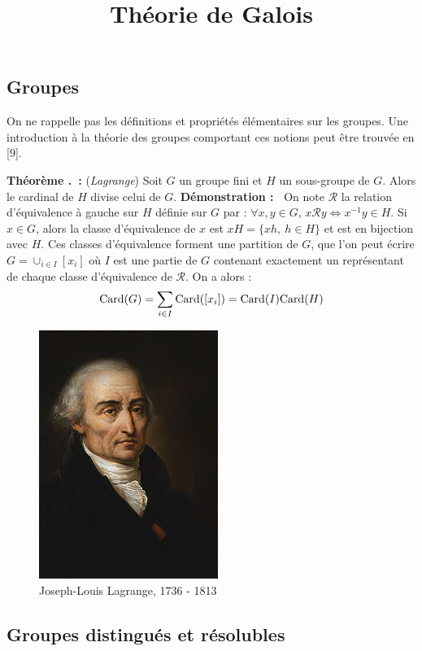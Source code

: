 \documentclass[5pt,a4paper]{article}
\title{Théorie de Galois}
\date{}
\newcounter{prop}[section]
\newcounter{thm}[section]
\renewcommand{\thethm}{\thesection.\arabic{thm}}
\newcommand{\thm}[1]{\stepcounter{thm}\noindent\textbf{Théorème \thethm ~:} #1 \newline}
\newcommand{\demo}[1]{\textbf{Démonstration :~} #1 \newline}
\begin{document}
\maketitle
\begin{onehalfspacing}

\newpage
\section{Groupes}
On ne rappelle pas les définitions et propriétés élémentaires sur les groupes. Une introduction à la théorie des groupes comportant ces notions peut être trouvée en [9]. \newline


\thm{(\textit{Lagrange}) Soit $G$ un groupe fini et $H$ un sous-groupe de $G$. Alors le cardinal de $H$ divise celui de $G$.}
\demo{On note $\mathcal{R}$ la relation d'équivalence à gauche sur $H$ définie sur $G$ par : $\forall x,y \in G$, $x \mathcal{R} y \Leftrightarrow x^{-1}y \in H$. Si $x \in G$, alors la classe d'équivalence de $x$ est $xH = \{xh,~h \in H\}$ et est en bijection avec $H$. Ces classes d'équivalence forment une partition de $G$, que l'on peut écrire $G = \cup_{i \in I}[x_i]$ où $I$ est une partie de $G$ contenant exactement un représentant de chaque classe d'équivalence de $\mathcal{R}$. On a alors : 
\[\textup{Card}(G) = \sum_{i \in I} \textup{Card}([x_i]) = \textup{Card}(I)\textup{Card}(H)\]
}


\begin{figure}[!h]
\centering
\includegraphics[width = 0.33\linewidth]{ressources/lagrange.jpg}
\caption{Joseph-Louis Lagrange, 1736 - 1813}
\end{figure}


\subsection{Groupes distingués et résolubles}


\end{onehalfspacing}
\end{document}
